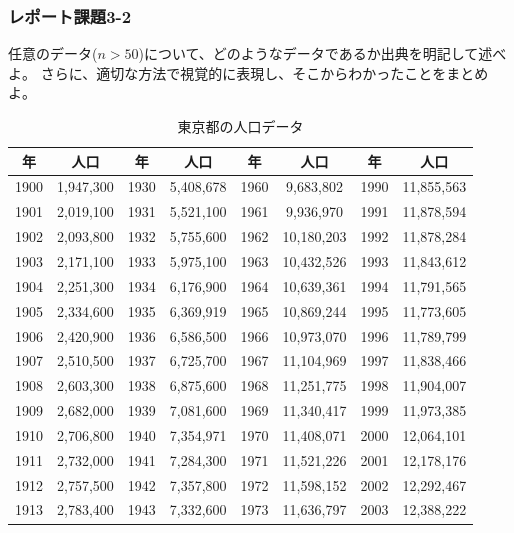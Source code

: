 \documentclass[12pt]{jarticle}
\begin{document}
\subsubsection*{レポート課題3-2}
\begin{shadebox}
    任意のデータ($n>50$)について、どのようなデータであるか出典を明記して述べよ。
    さらに、適切な方法で視覚的に表現し、そこからわかったことをまとめよ。
\end{shadebox}
\begin{table}
    \begin{center}
        \caption{東京都の人口データ}
        \begin{tabular}[t]{|c|c||c|c||c|c||c|c|}
            \hline
            年   & 人口      & 年   & 人口      & 年   & 人口       & 年   & 人口       \\
            \hline
            1900 & 1,947,300 & 1930 & 5,408,678 & 1960 & 9,683,802  & 1990 & 11,855,563 \\
            1901 & 2,019,100 & 1931 & 5,521,100 & 1961 & 9,936,970  & 1991 & 11,878,594 \\
            1902 & 2,093,800 & 1932 & 5,755,600 & 1962 & 10,180,203 & 1992 & 11,878,284 \\
            1903 & 2,171,100 & 1933 & 5,975,100 & 1963 & 10,432,526 & 1993 & 11,843,612 \\
            1904 & 2,251,300 & 1934 & 6,176,900 & 1964 & 10,639,361 & 1994 & 11,791,565 \\
            1905 & 2,334,600 & 1935 & 6,369,919 & 1965 & 10,869,244 & 1995 & 11,773,605 \\
            1906 & 2,420,900 & 1936 & 6,586,500 & 1966 & 10,973,070 & 1996 & 11,789,799 \\
            1907 & 2,510,500 & 1937 & 6,725,700 & 1967 & 11,104,969 & 1997 & 11,838,466 \\
            1908 & 2,603,300 & 1938 & 6,875,600 & 1968 & 11,251,775 & 1998 & 11,904,007 \\
            1909 & 2,682,000 & 1939 & 7,081,600 & 1969 & 11,340,417 & 1999 & 11,973,385 \\
            1910 & 2,706,800 & 1940 & 7,354,971 & 1970 & 11,408,071 & 2000 & 12,064,101 \\
            1911 & 2,732,000 & 1941 & 7,284,300 & 1971 & 11,521,226 & 2001 & 12,178,176 \\
            1912 & 2,757,500 & 1942 & 7,357,800 & 1972 & 11,598,152 & 2002 & 12,292,467 \\
            1913 & 2,783,400 & 1943 & 7,332,600 & 1973 & 11,636,797 & 2003 & 12,388,222 \\

\end{tabular}
\end{center}
\end{table}
\end{document}
